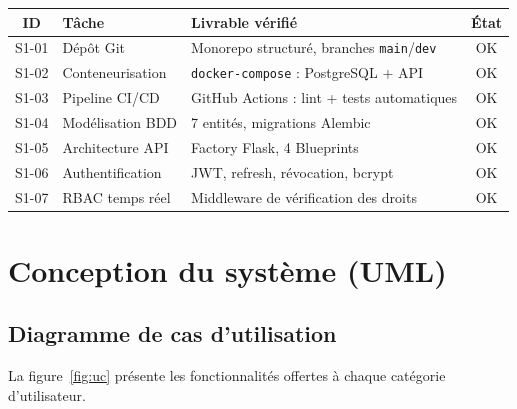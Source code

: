 \documentclass[11pt,a4paper]{article}
\begin{document}
\begin{center}
\begin{tabular}{clp{6.6cm}c}
  \toprule
  \textbf{ID} & \textbf{Tâche} & \textbf{Livrable vérifié} & \textbf{État} \\
  \midrule
  S1-01 & Dépôt Git & Monorepo structuré, branches \texttt{main}/\texttt{dev} & \textcolor{vert}{OK} \\
  S1-02 & Conteneurisation & \texttt{docker-compose} : PostgreSQL + API & \textcolor{vert}{OK} \\
  S1-03 & Pipeline CI/CD & GitHub Actions : lint + tests automatiques & \textcolor{vert}{OK} \\
  S1-04 & Modélisation BDD & 7 entités, migrations Alembic & \textcolor{vert}{OK} \\
  S1-05 & Architecture API & Factory Flask, 4 Blueprints & \textcolor{vert}{OK} \\
  S1-06 & Authentification & JWT, refresh, révocation, bcrypt & \textcolor{vert}{OK} \\
  S1-07 & RBAC temps réel & Middleware de vérification des droits & \textcolor{vert}{OK} \\
  \bottomrule
\end{tabular}
\end{center}

\section{Conception du système (UML)}

\subsection{Diagramme de cas d'utilisation}
La figure~\ref{fig:uc} présente les fonctionnalités offertes à chaque catégorie d'utilisateur.
\end{document}
